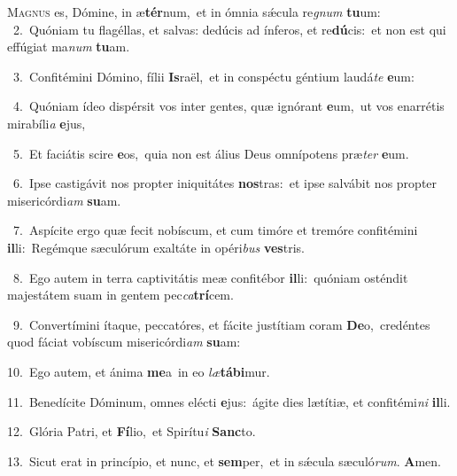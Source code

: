 \lettrine{\initial\textcolor{\initialcolor}{M}}{agnus} es, Dómine, in æ\-\textbf{tér}\-num,~\star et in ómnia sǽcula re\textit{gnum} \textbf{tu}\-um:\\
{\numbfont\textcolor{\numbcolor}{~2.}}~Quóniam tu flagéllas, et salvas: dedúcis ad ínferos, et re\-\textbf{dú}\-cis:~\star et non est qui effúgiat ma\textit{num} \textbf{tu}\-am.\par
{\numbfont\textcolor{\numbcolor}{~3.}}~Confitémini Dómino, fílii \textbf{Is}\-raël,~\star et in conspéctu géntium laudá\textit{te} \textbf{e}\-um:\par
{\numbfont\textcolor{\numbcolor}{~4.}}~Quóniam ídeo dispérsit vos inter gentes, quæ ignórant \textbf{e}\-um,~\star ut vos enarrétis mirabíli\textit{a} \textbf{e}\-jus,\par
{\numbfont\textcolor{\numbcolor}{~5.}}~Et faciátis scire \textbf{e}\-os,~\star quia non est álius Deus omnípotens præ\textit{ter} \textbf{e}\-um.\par
{\numbfont\textcolor{\numbcolor}{~6.}}~Ipse castigávit nos propter iniquitátes \textbf{nos}\-tras:~\star et ipse salvábit nos propter misericórdi\textit{am} \textbf{su}\-am.\par
{\numbfont\textcolor{\numbcolor}{~7.}}~Aspícite ergo quæ fecit nobíscum, et cum timóre et tremóre confitémini \textbf{il}\-li:~\star Regémque sæculórum exaltáte in opéri\textit{bus} \textbf{ves}\-tris.\par
{\numbfont\textcolor{\numbcolor}{~8.}}~Ego autem in terra captivitátis meæ confitébor \textbf{il}\-li:~\star quóniam osténdit majestátem suam in gentem pec\-\textit{ca}\-\textbf{trí}cem.\par
{\numbfont\textcolor{\numbcolor}{~9.}}~Convertímini ítaque, peccatóres, et fácite justítiam coram \textbf{De}\-o,~\star credéntes quod fáciat vobíscum misericórdi\textit{am} \textbf{su}\-am:\par
{\numbfont\textcolor{\numbcolor}{10.}}~Ego autem, et ánima \textbf{me}\-a~\star in eo \textit{læ}\-\textbf{tá}\textbf{bi}mur.\par
{\numbfont\textcolor{\numbcolor}{11.}}~Benedícite Dóminum, omnes elécti \textbf{e}\-jus:~\star ágite dies lætítiæ, et confitémi\textit{ni} \textbf{il}\-li.\par
{\numbfont\textcolor{\numbcolor}{12.}}~Glória Patri, et \textbf{Fí}\-lio,~\star et Spirítu\textit{i} \textbf{Sanc}\-to.\par
{\numbfont\textcolor{\numbcolor}{13.}}~Sicut erat in princípio, et nunc, et \textbf{sem}\-per,~\star et in sǽcula sæculó\-\textit{rum}\-. \textbf{A}\-men.\par
